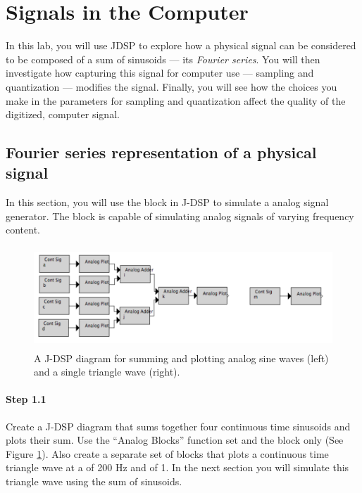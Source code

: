 
\section{Signals in the Computer}

In this lab, you will use JDSP to explore how a physical signal can
be considered to be composed of a sum of sinusoids --- its
\emph{Fourier series}. You will then investigate how capturing this
signal for computer use --- sampling and quantization --- modifies the
signal. Finally, you will see how the choices you make in the
parameters for sampling and quantization affect the quality of the
digitized, computer signal. 



\subsection{Fourier series representation of a physical signal}
	In this section, you will use the   block in J-DSP to simulate a analog signal 
	generator. The  block is capable of simulating analog signals of varying frequency content. 
	
	\begin{figure}[b]
	  \begin{center}
	    \includegraphics[height=1.5in]{lab3/block_diagram_step1}
	  \end{center}
	\caption{ A J-DSP diagram for summing and plotting analog sine waves (left) and a single 
	triangle wave (right). 
	\label{fg:step1}}
	\end{figure}

\paragraph{Step 1.1} Create a J-DSP diagram that sums together four continuous time sinusoids 
	and plots their sum. Use the ``Analog Blocks'' function set and the  block only (See 
	Figure \ref{fg:step1}). Also create a separate set of blocks that plots a continuous time triangle 
	wave at a  of 200 Hz and  of 1. In the next section you will 
	simulate this triangle wave using the sum of sinusoids.

